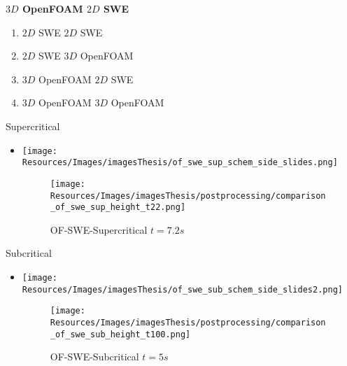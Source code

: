 \begin{frame}
\begin{minipage}{0.5\textwidth}
\large  \textbf{$3D$ OpenFOAM    $2D$ SWE }
\end{minipage}
\hspace{4cm}
\begin{minipage}{0.21\textwidth}
\vspace{-1.5cm}
{\scriptsize
\begin{tcolorbox}[colframe=black, colback=white] 
\setlength{\leftmargini}{0pt}
\begin{enumerate}
\item[] {\color{black!20}$2D$ SWE    $2D$ SWE}
\item[] {\color{black!60}$2D$ SWE    $3D$ OpenFOAM}
\item[] $3D$ OpenFOAM     $2D$ SWE
\item[] {\color{black!20}$3D$ OpenFOAM     $3D$ OpenFOAM}
\end{enumerate}
\end{tcolorbox}}
\end{minipage}

\begin{minipage}{0.45\textwidth}
\centering
Supercritical
\begin{itemize}
\item<2->[]
\begin{minipage}{0.2\textwidth}
\texttt{[image: Resources/Images/imagesThesis/of\_swe\_sup\_schem\_side\_slides.png]}
\end{minipage}
\begin{minipage}{0.75\textwidth}
\begin{figure}
\texttt{[image: Resources/Images/imagesThesis/postprocessing/comparison\_of\_swe\_sup\_height\_t22.png]}
\caption{OF-SWE-Supercritical $t=7.2s$}
\end{figure}
\end{minipage}
\end{itemize}
\end{minipage}
\begin{minipage}{0.45\textwidth}
\centering
Subcritical\\
\begin{itemize}
\item<3->[]
\begin{minipage}{0.2\textwidth}
\texttt{[image: Resources/Images/imagesThesis/of\_swe\_sub\_schem\_side\_slides2.png]}
\end{minipage}
\begin{minipage}{0.75\textwidth}
\begin{figure}
\texttt{[image: Resources/Images/imagesThesis/postprocessing/comparison\_of\_swe\_sub\_height\_t100.png]}
\caption{OF-SWE-Subcritical $t=5s$}
\end{figure}
\end{minipage}
\end{itemize}
\end{minipage}
\end{frame}